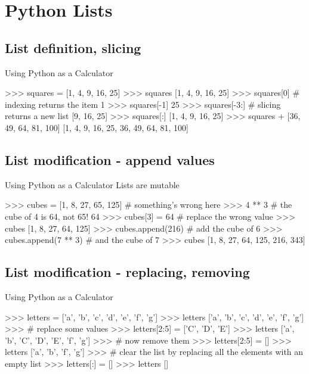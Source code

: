 \documentclass[11pt]{beamer}
\begin{document}
\section{Python Lists}

\subsection{List definition, slicing}
\begin{frame}[containsverbatim]{Using Python as a Calculator}
\begin{python}
>>> squares = [1, 4, 9, 16, 25]
>>> squares
[1, 4, 9, 16, 25]
>>> squares[0]  # indexing returns the item
1
>>> squares[-1]
25
>>> squares[-3:]  # slicing returns a new list
[9, 16, 25]
>>> squares[:]
[1, 4, 9, 16, 25]
>>> squares + [36, 49, 64, 81, 100]
[1, 4, 9, 16, 25, 36, 49, 64, 81, 100]
\end{python}
\end{frame}

\subsection{List modification - append values}
\begin{frame}[containsverbatim]{Using Python as a Calculator}
Lists are mutable
\begin{python}
>>> cubes = [1, 8, 27, 65, 125]  # something's wrong here
>>> 4 ** 3  # the cube of 4 is 64, not 65!
64
>>> cubes[3] = 64  # replace the wrong value
>>> cubes
[1, 8, 27, 64, 125]
>>> cubes.append(216)  # add the cube of 6
>>> cubes.append(7 ** 3)  # and the cube of 7
>>> cubes
[1, 8, 27, 64, 125, 216, 343]
\end{python}
\end{frame}

\subsection{List modification - replacing, removing}
\begin{frame}[containsverbatim]{Using Python as a Calculator}
\begin{python}
>>> letters = ['a', 'b', 'c', 'd', 'e', 'f', 'g']
>>> letters
['a', 'b', 'c', 'd', 'e', 'f', 'g']
>>> # replace some values
>>> letters[2:5] = ['C', 'D', 'E']
>>> letters
['a', 'b', 'C', 'D', 'E', 'f', 'g']
>>> # now remove them
>>> letters[2:5] = []
>>> letters
['a', 'b', 'f', 'g']
>>> # clear the list by replacing all the elements with an empty list
>>> letters[:] = []
>>> letters
[]
\end{python}
\end{frame}
\end{document}
